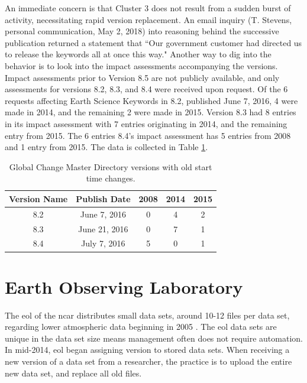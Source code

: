 An immediate concern is that Cluster 3 does not result from a sudden burst of activity, necessitating rapid \gls{version} replacement.
An email inquiry (T. Stevens, personal communication, May 2, 2018) into reasoning behind the successive publication returned a statement that ``Our government customer had directed us to release the keywords all at once this way."
Another way to dig into the behavior is to look into the impact assessments accompanying the versions.
Impact assessments prior to Version 8.5 are not publicly available, and only assessments for versions 8.2, 8.3, and 8.4 were received upon request.
Of the 6 requests affecting Earth Science Keywords in 8.2, published June 7, 2016, 4 were made in 2014, and the remaining 2 were made in 2015.
Version 8.3 had 8 entries in its impact assessment with 7 entries originating in 2014, and the remaining entry from 2015.
The 6 entries 8.4’s impact assessment has 5 entries from 2008 and 1 entry from 2015.
The data is collected in Table \ref{table:GCMD_old}.
\begin{table}
	\caption{Global Change Master Directory versions with old start time changes.}
	\label{table:GCMD_old}
	\centering
	\begin{tabular}{|c|c|c|c|c|}
		\hline
		Version Name&	Publish Date&	2008&	2014&	2015\\ \hline
		8.2&	June 7, 2016&	0&	4&	2\\
		8.3&	June 21, 2016&	0&	7&	1\\
		8.4&	July 7, 2016&	5&	0&	1\\
		\hline
	\end{tabular}
\end{table}


\section{Earth Observing Laboratory}

The \gls{eol} of the \gls{ncar} distributes small data sets, around 10-12 files per data set, regarding lower atmospheric data beginning in 2005 \cite{EOL}.
The \gls{eol} data sets are unique in the data set size means management often does not require automation.
In mid-2014, \gls{eol} began assigning \gls{version} to stored data sets.
When receiving a new \gls{version} of a data set from a researcher, the practice is to upload the entire new data set, and replace all old files.

